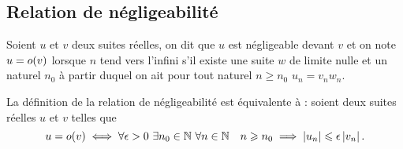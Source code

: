 \subsection{Relation de négligeabilité}

\begin{defdef}
  Soient \(u\) et \(v\) deux suites réelles, on dit que \(u\) est négligeable 
  devant \(v\) et on note \(u = o\mathopen{}\left(v\right)\) lorsque \(n\) tend vers l'infini 
  s'il existe une suite \(w\) de limite nulle et un naturel \(n_0\) à partir 
  duquel on ait pour tout naturel \(n \geqslant n_0\) \(u_n = v_n w_n\).
\end{defdef}
\begin{prop}
  La définition de la relation de négligeabilité est équivalente à : soient deux 
  suites réelles \(u\) et \(v\) telles que
  \begin{equation}
    u = o\mathopen{}\left(v\right) \iff \forall \epsilon > 0 \ \exists n_0 \in \mathbb{N} \ \forall n 
    \in \mathbb{N} \quad n \geqslant n_0 \implies \left\lvert u_n\right\rvert \leqslant \epsilon 
    \left\lvert v_n\right\rvert.
  \end{equation}
\end{prop}
